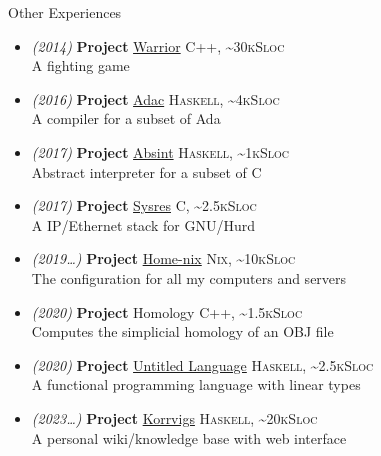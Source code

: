 \documentclass[a4paper,11pt]{extarticle}
\newcommand{\cvtitle}[1]{
    \begin{tcolorbox}[colback=sidebg,colframe=sidefg,coltext=sidetext,
        height=1cm, valign=center, sharp corners=downhill]
        {\large #1}
    \end{tcolorbox}
}
\newcommand{\lang}[2]{\hfill \textsc{\scriptsize #1, \textasciitilde#2Sloc}}
\begin{document}
\begin{minipage}[c][282mm][t]{0.60\linewidth}
{        \cvtitle{Other Experiences}

        \begin{itemize}
          \itemsep0em
          \item \emph{\small (2014)} \textbf{Project} \href{https://github.com/DWARVES/Project-Warrior}{Warrior}
                \lang{C++}{30k}\\
                A fighting game
          \item \emph{\small (2016)} \textbf{Project} \href{https://github.com/TWal/ENS\_Adac}{Adac}
                \lang{Haskell}{4k}\\
                A compiler for a subset of Ada
          \item \emph{\small (2017)} \textbf{Project} \href{https://github.com/dwarfmaster/absint}{Absint}
                \lang{Haskell}{1k}\\
                Abstract interpreter for a subset of C
          \item \emph{\small (2017)} \textbf{Project} \href{https://github.com/dwarfmaster/ENS_sysres}{Sysres}
                \lang{C}{2.5k}\\
                A IP/Ethernet stack for GNU/Hurd
          \item \emph{\small (2019\dots)} \textbf{Project} \href{https://github.com/dwarfmaster/home-nix}{Home-nix}
                \lang{Nix}{10k}\\
                The configuration for all my computers and servers
          \item \emph{\small (2020)} \textbf{Project} Homology
                \lang{C++}{1.5k}\\
                Computes the simplicial homology of an OBJ file
          \item \emph{\small (2020)} \textbf{Project} \href{https://github.com/math-fehr/Untitled-Language}{Untitled Language}
                \lang{Haskell}{2.5k}\\
                A functional programming language with linear types
          \item \emph{\small (2023\dots)} \textbf{Project} \href{https://github.com/dwarfmaster/korrvigs}{Korrvigs}
                \lang{Haskell}{20k}\\
                A personal wiki/knowledge base with web interface
        \end{itemize}

      }
    \end{minipage}
\end{document}
